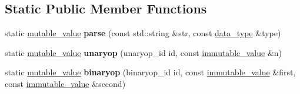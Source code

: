 \subsection*{Static Public Member Functions}
\begin{DoxyCompactItemize}
\item 
\mbox{\label{classdialog_1_1mutable__value_a81096a1163464473f3fcb346644f1631}} 
static \hyperlink{classdialog_1_1mutable__value}{mutable\+\_\+value} {\bfseries parse} (const std\+::string \&str, const \hyperlink{structdialog_1_1data__type}{data\+\_\+type} \&type)
\item 
\mbox{\label{classdialog_1_1mutable__value_a53e69a0ccf0aef556db129313fc120d1}} 
static \hyperlink{classdialog_1_1mutable__value}{mutable\+\_\+value} {\bfseries unaryop} (unaryop\+\_\+id id, const \hyperlink{classdialog_1_1immutable__value}{immutable\+\_\+value} \&n)
\item 
\mbox{\label{classdialog_1_1mutable__value_ac0913ac341698f2cef43a3804f780bde}} 
static \hyperlink{classdialog_1_1mutable__value}{mutable\+\_\+value} {\bfseries binaryop} (binaryop\+\_\+id id, const \hyperlink{classdialog_1_1immutable__value}{immutable\+\_\+value} \&first, const \hyperlink{classdialog_1_1immutable__value}{immutable\+\_\+value} \&second)
\end{DoxyCompactItemize}
